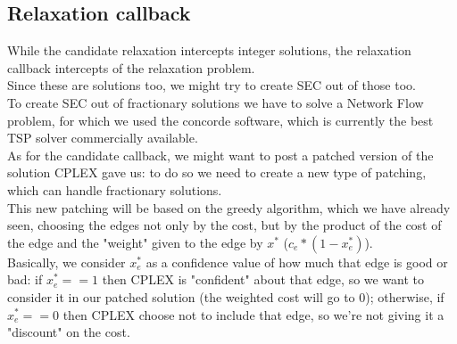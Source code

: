 \subsection{Relaxation callback}
While the candidate relaxation intercepts integer solutions, the relaxation callback intercepts of the relaxation problem.\\
Since these are solutions too, we might try to create SEC out of those too.\\
To create SEC out of fractionary solutions we have to solve a Network Flow problem, for which we used the concorde software, which is currently the best TSP solver commercially available.\\
As for the candidate callback, we might want to post a patched version of the solution CPLEX gave us: to do so we need to create a new type of patching, which can handle fractionary solutions.\\
This new patching will be based on the greedy algorithm, which we have already seen, choosing the edges not only by the cost, but by the product of the cost of the edge and the "weight" given to the edge by $x^*$ ($c_e * (1 - x^*_e)$).\\
Basically, we consider $x^*_e$ as a confidence value of how much that edge is good or bad: if $x^*_e == 1$ then CPLEX is "confident" about that edge, so we want to consider it in our patched solution (the weighted cost will go to 0); otherwise, if $x^*_e == 0$ then CPLEX choose not to include that edge, so we're not giving it a "discount" on the cost.


